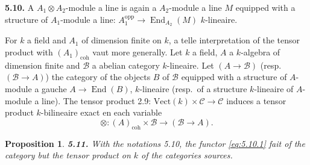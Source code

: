\documentclass[12pt,a4paper]{article}
\theoremstyle{plain}
\newtheorem{proposition}[theorem]{Proposition}
\theoremstyle{definition}
\theoremstyle{remark}
\DeclareMathOperator{\End}{End}
\begin{document}
\textbf{5.10.} A $A_1 \otimes A_2$-module a line is again a $A_2$-module a line $M$ equipped with a structure of $A_1$-module a line: $A_1^\mathrm{opp} \to \End_{A_2}(M)$ $k$-lineaire.

For $k$ a field and $A_1$ of dimension finite on $k$, a telle interpretation of the tensor product with $(A_1)_\mathrm{coh}$ vaut more generally. Let $k$ a field, $A$ a $k$-algebra of dimension finite and $\mathcal{B}$ a abelian category $k$-lineaire. Let $(A \to \mathcal{B})$ (resp.~$(\mathcal{B} \to A)$) the category of the objects $B$ of $\mathcal{B}$ equipped with a structure of $A$-module a gauche $A \to \End(B)$, $k$-lineaire (resp.~of a structure $k$-lineaire of $A$-module a line). The tensor product 2.9: $\mathrm{Vect}(k) \times \mathcal{C} \to \mathcal{C}$ induces a tensor product $k$-bilineaire exact en each variable
\begin{equation}\label{eq:5.10.1}
\otimes : (A)_\mathrm{coh} \times \mathcal{B} \longrightarrow (\mathcal{B} \to A).
\end{equation}

\begin{proposition}\label{prop:5.11}
\textbf{5.11.} With the notations 5.10, the functor \eqref{eq:5.10.1} fait of the category but the tensor product on $k$ of the categories sources.
\end{proposition}
\end{document}
